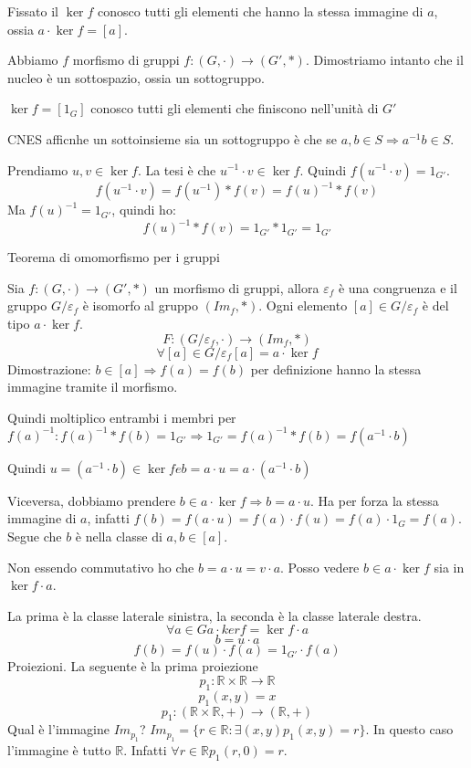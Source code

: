 Fissato il $\ker f$ conosco tutti gli elementi che hanno la stessa immagine di $a$, ossia $a \cdot \ker f = [a]$.

Abbiamo $f$ morfismo di gruppi $ f : (G, \cdot ) \to (G', \ast)$. Dimostriamo intanto che il nucleo \`e un sottospazio, ossia un sottogruppo.

$\ker f = [1_G]$ conosco tutti gli elementi che finiscono nell'unit\`a di $G'$

CNES afficnhe un sottoinsieme sia un sottogruppo \`e che se $a, b \in S \Rightarrow a^{-1} b \in S$.

Prendiamo $u, v \in \ker f$. La tesi \`e che $u^{-1} \cdot v \in \ker f$. Quindi $f ( u^{-1} \cdot v ) = 1_{G'}$.
\[
f( u^{-1} \cdot v ) = f(u^{-1}) \ast f(v) = f(u)^{-1} \ast f(v)
\]
Ma $f(u)^{-1} = 1_{G'}$, quindi ho:
\[
f(u)^{-1} \ast f(v) = 1_{G'} \ast 1_{G'} = 1_{G'}
\]

Teorema di omomorfismo per i gruppi

Sia $f : (G, \cdot) \to (G', \ast)$ un morfismo di gruppi, allora $\varepsilon_f$ \`e una congruenza e il gruppo $G / \varepsilon_f$ \`e isomorfo al gruppo $(Im_f, \ast)$. Ogni elemento $[a] \in G / \varepsilon_f$ \`e del tipo $a \cdot \ker f$.
\[
F : (G / \varepsilon_f, \cdot) \to (Im_f, \ast)
\]
\[
\forall [a] \in G / \varepsilon_f [a] = a \cdot \ker f
\]
Dimostrazione:
$b \in [a] \Rightarrow f(a) = f(b)$ per definizione hanno la stessa immagine tramite il morfismo.

Quindi moltiplico entrambi i membri per $f(a)^{-1}: f(a)^{-1} \ast f(b) = 1_{G'} \Rightarrow 1_{G'} = f(a)^{-1} \ast f(b) = f(a^{-1} \cdot b)$

Quindi $u = (a^{-1} \cdot b ) \in \ker f e b = a \cdot u = a \cdot (a^{-1} \cdot b)$

Viceversa, dobbiamo prendere $b \in a \cdot \ker f \Rightarrow b = a \cdot u$. Ha per forza la stessa immagine di $a$, infatti $f(b) = f(a \cdot u) = f(a) \cdot f(u) = f(a) \cdot 1_G = f(a)$. Segue che $b$ \`e nella classe di $a, b \in [a]$.

Non essendo commutativo ho che $b = a \cdot u = v \cdot a$. Posso vedere $b \in a \cdot \ker f$ sia in $\ker f \cdot a$.

La prima \`e la classe laterale sinistra, la seconda \`e la classe laterale destra.
\[
\forall a \in G a \cdot ker f = \ker f \cdot a
\]
\[
b = u \cdot a
\]
\[
f(b) = f(u) \cdot f(a) = 1_{G'} \cdot f(a)
\]
Proiezioni. La seguente \`e la prima proiezione
\[
p_1 : \mathbb{R} \times \mathbb{R} \to \mathbb{R}
\]
\[
p_1 (x, y) = x
\]
\[
p_1 : (\mathbb{R} \times \mathbb{R}, +) \to (\mathbb{R}, +)
\]
Qual \`e l'immagine $Im_{p_1}$? $Im_{p_1} = \{ r \in \mathbb{R} : \exists (x, y) p_1 (x, y) = r \}$. In questo caso l'immagine \`e tutto $\mathbb{R}$. Infatti $\forall r \in \mathbb{R} p_1(r, 0) = r$.

